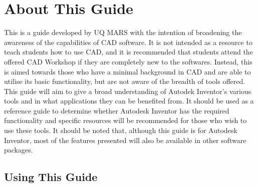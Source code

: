 \section{About This Guide}

This is a guide developed by UQ MARS with the intention of broadening the awareness of the capabilities of CAD software. It is not intended as a resource to teach students how to use CAD, and it is recommended that students attend the offered CAD Workshop if they are completely new to the softwares. Instead, this is aimed towards those who have a minimal background in CAD and are able to utilise its basic functionality, but are not aware of the breadth of tools offered. This guide will aim to give a broad understanding of Autodek Inventor's various tools and in what applications they can be benefited from. It should be used as a reference guide to determine whether Autodesk Inventor has the required functionality and specific resources will be recommended for those who wish to use these tools. It should be noted that, although this guide is for Autodesk Inventor, most of the features presented will also be available in other software packages.

\subsection{Using This Guide}